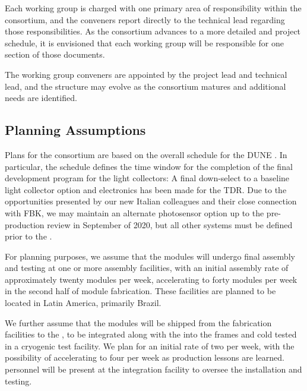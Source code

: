 Each working group is charged with one primary area of responsibility within the consortium, and the conveners report directly to the technical lead regarding those responsibilities.  As the consortium advances to a more detailed  and project schedule, it is envisioned that each working group will be responsible for one section of those documents.

The working group conveners are appointed by the  project lead and technical lead, and the structure may evolve as the consortium matures and additional needs are identified. 

\subsection{Planning Assumptions}
\label{sec:fdsp-pd-org-assmp}

Plans for the  consortium are based on the overall schedule for the DUNE . In particular, the  schedule defines the time window for the completion of the final development program for the light collectors: A final down-select to a baseline light collector option and  electronics has been made for the TDR.  Due to the opportunities presented by our new Italian colleagues and their close connection with FBK, we may maintain an alternate photosensor option up to the pre-production review in September of 2020, but all other systems must be defined prior to the .

For planning purposes, we assume that the  modules will undergo final assembly and testing at one or more  assembly facilities, with an initial  assembly rate of approximately twenty modules per week, accelerating to forty modules per week in the second half of module fabrication.  These facilities are planned to be located in Latin America, primarily Brazil.

We further assume that the modules will be shipped from the fabrication facilities to the , 
to be integrated along with the  into the  frames and cold tested in a cryogenic test facility.  We plan for an initial rate of two  per week, with the possibility of accelerating to four  per week as production lessons are learned.   personnel will be present at the integration facility to oversee the installation and testing.

